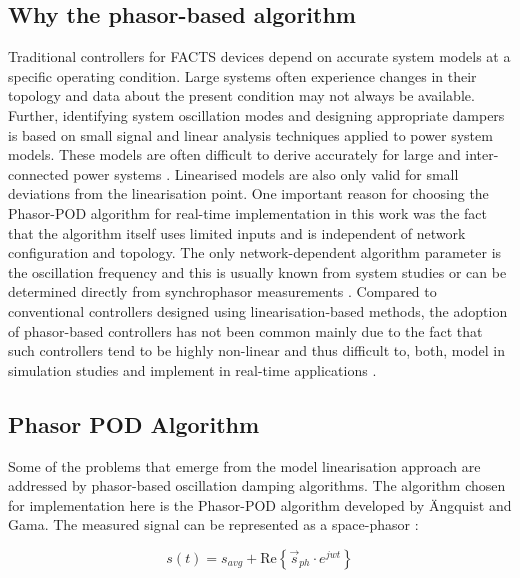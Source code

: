 \documentclass[journal]{IEEEtran}
\begin{document}
\subsection{Why the phasor-based algorithm}  %
Traditional controllers for FACTS devices depend on accurate system models at a specific operating condition. Large systems often experience changes in their topology and data about the present condition may not always be available. Further, identifying system oscillation modes and designing appropriate dampers is based on small signal and linear analysis techniques applied to power system models. These models are often difficult to derive accurately for large and inter-connected power systems \cite{WAMTCSC}. Linearised models are also only valid for small deviations from the linearisation point. One important reason for choosing the Phasor-POD algorithm for real-time implementation in this work was the fact that the algorithm itself uses limited inputs and is independent of network configuration and topology. The only network-dependent algorithm parameter is the oscillation frequency and this is usually known from system studies or can be determined directly from synchrophasor measurements \cite{TaskForce}. Compared to conventional controllers designed using linearisation-based methods, the adoption of phasor-based controllers has not been common mainly due to the fact that such controllers tend to be highly non-linear and thus difficult to, both, model in simulation studies \cite{Chaudhuri} and implement in real-time applications \cite{WAPODNorway}.

\subsection{Phasor POD Algorithm}

Some of the problems that emerge from the model linearisation approach are addressed by phasor-based oscillation damping algorithms. The algorithm chosen for implementation here is the Phasor-POD algorithm developed by \"{A}ngquist and Gama\cite{PhasorPOD}. The measured signal can be represented as a space-phasor \cite{Chaudhuri}: 

\begin{equation}
s(t)={s}_{avg}+\mathrm{Re}\left\{{\stackrel{\to }{s}}_{ph}\cdot {e}^{{jwt}}\right\}
\end{equation}
\end{document}
